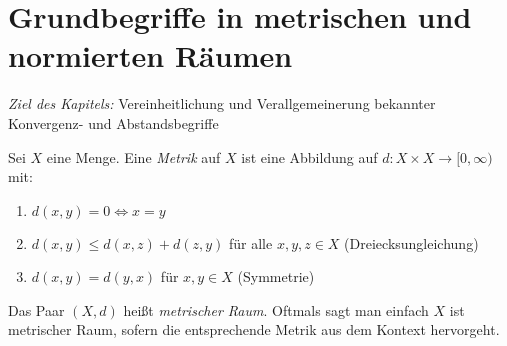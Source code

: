 \cleardoublepage
\section{Grundbegriffe in metrischen und normierten Räumen}
\emph{Ziel des Kapitels:} Vereinheitlichung und Verallgemeinerung bekannter \\
Konvergenz- und Abstandsbegriffe

\begin{Definition}{ \label{def:metrik}
	Sei $X$ eine Menge. Eine \emph{Metrik} auf $X$ ist eine Abbildung auf 
	$d: X \times X \rightarrow [0, \infty)$ mit:
	\begin{enumerate}
		\item[M1] \label{def:metrik:1}$d(x,y) = 0 \Leftrightarrow x = y$
		\item[M2] \label{def:metrik:2}$d(x,y) \leq d(x,z) + d(z,y)$ für alle $x,y,z \in X$ \hfill (Dreiecksungleichung)
		\item[M3] \label{def:metrik:3}$d(x,y) = d(y,x)$ für $x,y \in X$ \hfill (Symmetrie)
	\end{enumerate}
	Das Paar $(X,d)$ heißt \emph{metrischer Raum}. Oftmals sagt man einfach 
	$X$ ist metrischer Raum, sofern die entsprechende Metrik aus dem Kontext 
	hervorgeht.
}\end{Definition}


